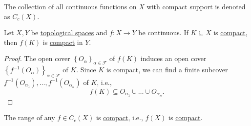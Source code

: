 \begin{notation}
	The collection of all continuous functions on \(X\) with \hyperref[def:compact]{compact} \hyperref[def:support]{support} is denoted as \(C_c(X)\).
\end{notation}

\begin{theorem}\label{thm:lec26}
	Let \(X, Y\) be \hyperref[def:topological-space]{topological spaces} and \(f\colon X \to Y\) be continuous. If \(K \subseteq X\) is \hyperref[def:compact]{compact}, then \(f(K)\) is \hyperref[def:compact]{compact} in \(Y\).
\end{theorem}
\begin{proof}
	The open cover \(\left\{ O_\alpha  \right\}_{\alpha \in \mathcal{F} } \) of \(f(K)\) induces an open cover \(\left\{ f^{-1} (O_\alpha ) \right\}_{\alpha \in \mathcal{F} } \) of \(K\). Since \(K\) is \hyperref[def:compact]{compact}, we can find a finite subcover \(f^{-1} (O_{\alpha _1}), \ldots , f^{-1} (O_{\alpha _n}) \) of \(K\), i.e.,
	\[
		f(K) \subseteq O_{\alpha _1} \cup \ldots \cup O_{\alpha _n}.
	\]
\end{proof}

\begin{remark}
	The range of any \(f\in C_c(X)\) is \hyperref[def:compact]{compact}, i.e., \(f(X)\) is \hyperref[def:compact]{compact}.
\end{remark}

